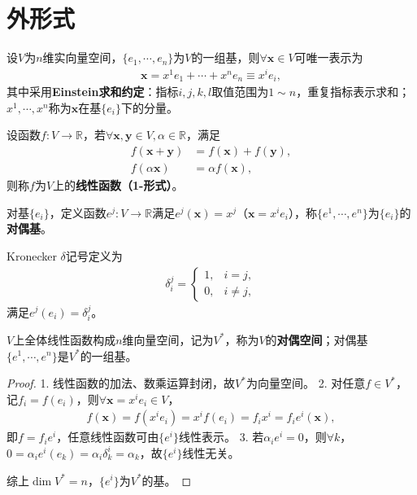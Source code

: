 \documentclass[../../main.tex]{subfiles}%
\begin{document}
\section{外形式}

\begin{definition}
设$V$为$n$维实向量空间，$\{e_1,\cdots,e_n\}$为$V$的一组基，则$\forall\boldsymbol{x}\in V$可唯一表示为
\begin{align*}
\boldsymbol{x}=x^1e_1+\cdots+x^ne_n\equiv x^ie_i,
\end{align*}
其中采用\textbf{Einstein求和约定}：指标$i,j,k,l$取值范围为$1\sim n$，重复指标表示求和；$x^1,\cdots,x^n$称为$\boldsymbol{x}$在基$\{e_i\}$下的分量。
\end{definition}

\begin{definition}
设函数$f:V\to\mathbb{R}$，若$\forall\boldsymbol{x},\boldsymbol{y}\in V,\alpha\in\mathbb{R}$，满足
\begin{align*}
f(\boldsymbol{x}+\boldsymbol{y})&=f(\boldsymbol{x})+f(\boldsymbol{y}),\\
f(\alpha\boldsymbol{x})&=\alpha f(\boldsymbol{x}),
\end{align*}
则称$f$为$V$上的\textbf{线性函数（1-形式）}。
\end{definition}

\begin{definition}
对基$\{e_i\}$，定义函数$e^j:V\to\mathbb{R}$满足$e^j(\boldsymbol{x})=x^j$（$\boldsymbol{x}=x^ie_i$），称$\{e^1,\cdots,e^n\}$为$\{e_i\}$的\textbf{对偶基}。
\end{definition}

\begin{definition}
Kronecker $\delta$记号定义为
\begin{align}
\delta_i^j=
\begin{cases}
1, & i=j,\\
0, & i\neq j,
\end{cases}
\label{eq:kronecker_delta}
\end{align}
满足$e^j(e_i)=\delta_i^j$。
\end{definition}

\begin{proposition}
$V$上全体线性函数构成$n$维向量空间，记为$V^*$，称为$V$的\textbf{对偶空间}；对偶基$\{e^1,\cdots,e^n\}$是$V^*$的一组基。
\end{proposition}
\begin{proof}

1. 线性函数的加法、数乘运算封闭，故$V^*$为向量空间。
2. 对任意$f\in V^*$，记$f_i=f(e_i)$，则$\forall\boldsymbol{x}=x^ie_i\in V$，
\begin{align*}
f(\boldsymbol{x})=f(x^ie_i)=x^if(e_i)=f_ix^i=f_ie^i(\boldsymbol{x}),
\end{align*}
即$f=f_ie^i$，任意线性函数可由$\{e^i\}$线性表示。
3. 若$\alpha_ie^i=0$，则$\forall k$，$0=\alpha_ie^i(e_k)=\alpha_i\delta_k^i=\alpha_k$，故$\{e^i\}$线性无关。

综上$\dim V^*=n$，$\{e^i\}$为$V^*$的基。

\end{proof}
\end{document}
